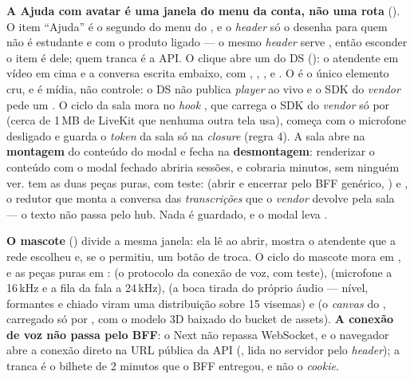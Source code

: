 \begin{decisao}
\textbf{A Ajuda com avatar é uma janela do menu da conta, não uma rota}
(). O item \enquote{Ajuda} é o segundo do menu do
, e o \emph{header} só o desenha para quem não é estudante e
com o produto  ligado --- o mesmo \emph{header} serve ,
então esconder o item é dele; quem tranca é a API. O clique abre um 
do DS (): o atendente em vídeo em
cima e a conversa escrita embaixo, com , ,
,  e . O  é o único
elemento cru, e é mídia, não controle: o DS não publica \emph{player} ao vivo e o
SDK do \emph{vendor} pede um . O ciclo da sala mora no
\emph{hook} , que carrega o SDK
do \emph{vendor} só por  (cerca de 1\,MB de LiveKit que nenhuma outra
tela usa), começa com o microfone desligado e guarda o \emph{token} da sala só na
\emph{closure} (regra 4). A sala abre na \textbf{montagem} do conteúdo do modal e
fecha na \textbf{desmontagem}: renderizar o conteúdo com o modal fechado abriria
sessões, e cobraria minutos, sem ninguém ver.  tem as duas
peças puras, com teste:  (abrir e encerrar pelo BFF genérico,
) e , o redutor que monta a
conversa das \emph{transcrições} que o \emph{vendor} devolve pela sala --- o texto
não passa pelo hub. Nada é guardado, e o modal leva .

\textbf{O mascote} () divide a mesma janela: ela lê
 ao abrir, mostra o atendente que a rede escolheu e,
se o  permitiu, um botão de troca. O ciclo do mascote mora em
, e as peças puras em
:  (o protocolo da conexão de
voz, com teste),  (microfone a 16\,kHz e a fila da fala a
24\,kHz),  (a boca tirada do próprio áudio --- nível,
formantes e chiado viram uma distribuição sobre 15 visemas) e 
(o \emph{canvas} do , carregado só por , com o modelo
3D baixado do bucket de assets). \textbf{A conexão de voz não passa pelo BFF}:
o Next não repassa WebSocket, e o navegador abre a conexão direto na URL
pública da API (, lida no servidor pelo
\emph{header}); a tranca é o bilhete de 2 minutos que o BFF entregou, e não o
\emph{cookie}.
\end{decisao}

